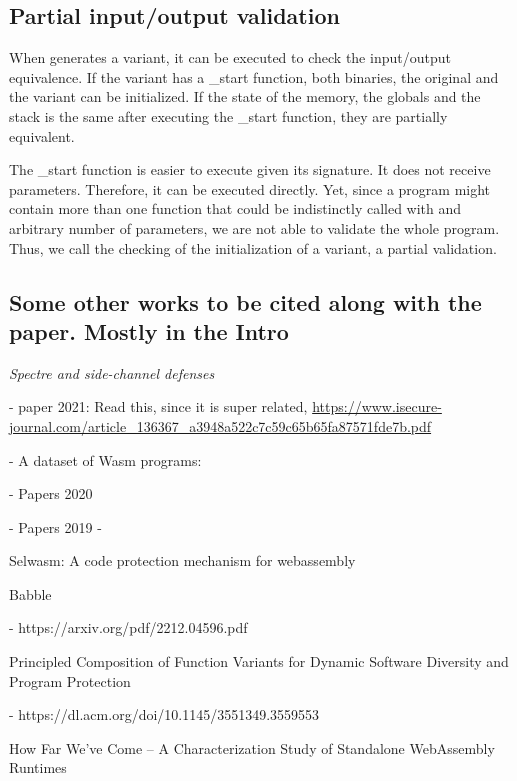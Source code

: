 \subsection{Partial input/output validation}

When \tool generates a variant, it can be executed to check the input/output equivalence.
If the variant has a \_start function, both binaries, the original and the variant can be initialized. 
If the state of the memory, the globals and the stack is the same after executing the \_start function, they are partially equivalent.

The \_start function is easier to execute given its signature.
It does not receive parameters.
Therefore, it can be executed directly.
Yet, since a \Wasm program might contain more than one function that could be indistinctly called with and arbitrary number of parameters, we are not able to validate the whole program.
Thus, we call the checking of the initialization of a \wasm variant, a partial validation.

\subsection{Some other works to be cited along with the paper. Mostly in the Intro}

\emph{Spectre and side-channel defenses}

- paper 2021: Read this, since it is super related, \url{https://www.isecure-journal.com/article_136367_a3948a522c7c59c65b65fa87571fde7b.pdf} \cite{WasmSpectre}


- A dataset of Wasm programs: \cite{nicholson2023wasmizer}

- Papers 2020

- Papers 2019
- \cite{10.1145/3510003.3510070}

Selwasm: A code protection mechanism for webassembly


Babble

- https://arxiv.org/pdf/2212.04596.pdf

Principled Composition of Function Variants for Dynamic
Software Diversity and Program Protection

- https://dl.acm.org/doi/10.1145/3551349.3559553

How Far We’ve Come – A Characterization Study of Standalone WebAssembly Runtimes

